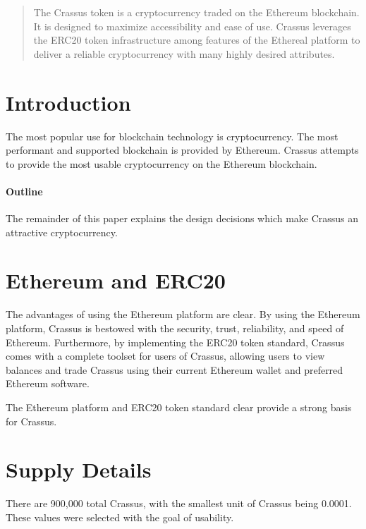 \documentclass[12pt]{article}
\begin{document}
\maketitle

\begin{abstract}
The Crassus token is a cryptocurrency traded on the Ethereum blockchain.  It is designed to maximize accessibility and ease of use.  Crassus leverages the ERC20 token infrastructure among features of the Ethereal platform to deliver a reliable cryptocurrency with many highly desired attributes.
\end{abstract}

\section{Introduction}
The most popular use for blockchain technology is cryptocurrency.  The most performant and supported blockchain is provided by Ethereum.  Crassus attempts to provide the most usable cryptocurrency on the Ethereum blockchain.

\paragraph{Outline}
The remainder of this paper explains the design decisions which make Crassus an attractive cryptocurrency.

\section{Ethereum and ERC20}\label{Ethereum and ERC20}
The advantages of using the Ethereum platform are clear.  By using the Ethereum platform, Crassus is bestowed with the security, trust, reliability, and speed of Ethereum.  Furthermore, by implementing the ERC20 token standard, Crassus comes with a complete toolset for users of Crassus, allowing users to view balances and trade Crassus using their current Ethereum wallet and preferred Ethereum software.

The Ethereum platform and ERC20 token standard clear provide a strong basis for Crassus.

\section{Supply Details}\label{Supply Details}
There are 900,000 total Crassus, with the smallest unit of Crassus being 0.0001.  These values were selected with the goal of usability.
\end{document}
